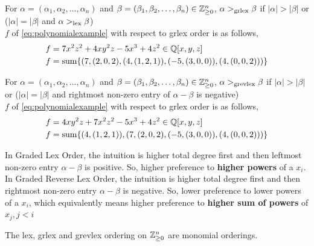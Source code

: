 \documentclass[a4paper,11pt]{article}
\begin{document}
\begin{defn}
    For $\alpha=(\alpha_1, \alpha_2, \ldots, \alpha_n)$ and $\beta=(\beta_1, \beta_2, \ldots, \beta_n) \in \mathbb{Z}^n_{\geq0}$, $\alpha>_{\text{grlex}}\beta$ if $|\alpha|>|\beta|$ or ($|\alpha|=|\beta|$ and $\alpha>_{\text{lex}}\beta$)\\
    $f$ of \ref{eq:polynomialexample} with  respect to grlex order is as follows,
    \begin{equation}
    \begin{aligned}
        f&=7x^2z^2+4xy^2z-5x^3+4z^2\in\mathbb{Q}[x,y,z]\\
        f&=\operatorname{sum}\{(7,(2,0,2), (4,(1,2,1)), (-5,(3,0,0)), (4,(0,0,2)))\}
    \end{aligned}
    \end{equation}
\end{defn}
\begin{defn}
    For $\alpha=(\alpha_1, \alpha_2, \ldots, \alpha_n)$ and $\beta=(\beta_1, \beta_2, \ldots, \beta_n) \in \mathbb{Z}^n_{\geq0}$, $\alpha>_{\text{grevlex}}\beta$ if $|\alpha|>|\beta|$ or ($|\alpha|=|\beta|$ and rightmost non-zero entry of $\alpha-\beta$ is negative)\\
    $f$ of \ref{eq:polynomialexample} with  respect to grlex order is as follows,
    \begin{equation}
    \begin{aligned}
        f&=4xy^2z+7x^2z^2-5x^3+4z^2\in\mathbb{Q}[x,y,z]\\
        f&=\operatorname{sum}\{(4,(1,2,1)), (7,(2,0,2), (-5,(3,0,0)), (4,(0,0,2)))\}
    \end{aligned}
    \end{equation}
\end{defn}
\begin{note}
    In Graded Lex Order, the intuition is higher total degree first and then leftmost non-zero entry $\alpha-\beta$ is positive. So, higher preference to \textbf{higher powers} of a $x_i$.\\
    In Graded Reverse Lex Order, the intuition is higher total degree first and then rightmost non-zero entry $\alpha-\beta$ is negative. So, lower preference to lower powers of a $x_i$, which equivalently means higher preference to \textbf{higher sum of powers} of $x_j, j<i$
\end{note}
\begin{prop}
    The lex, grlex and grevlex ordering on $\mathbb{Z}^n_{\geq0}$ are monomial orderings.
\end{prop}
\end{document}
